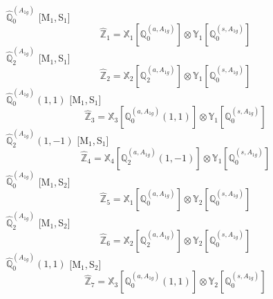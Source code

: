 \documentclass[fleqn,10pt,landscape]{article}
\begin{document}
\begin{itemize}
\vspace{4mm}
\noindent {} $\,\,\,\hat{\mathbb{Q}}_{0}^{(A_{1g})}$ [M$_{1}$,\,S$_{1}$]
\begin{dmath*}
\hat{\mathbb{Z}}_{1}=\mathbb{X}_{1}[\mathbb{Q}_{0}^{(a,A_{1g})}] \otimes\mathbb{Y}_{1}[\mathbb{Q}_{0}^{(s,A_{1g})}]
\end{dmath*}
\vspace{4mm}
\noindent {} $\,\,\,\hat{\mathbb{Q}}_{2}^{(A_{1g})}$ [M$_{1}$,\,S$_{1}$]
\begin{dmath*}
\hat{\mathbb{Z}}_{2}=\mathbb{X}_{2}[\mathbb{Q}_{2}^{(a,A_{1g})}] \otimes\mathbb{Y}_{1}[\mathbb{Q}_{0}^{(s,A_{1g})}]
\end{dmath*}
\vspace{4mm}
\noindent {} $\,\,\,\hat{\mathbb{Q}}_{0}^{(A_{1g})}(1,1)$ [M$_{1}$,\,S$_{1}$]
\begin{dmath*}
\hat{\mathbb{Z}}_{3}=\mathbb{X}_{3}[\mathbb{Q}_{0}^{(a,A_{1g})}(1,1)] \otimes\mathbb{Y}_{1}[\mathbb{Q}_{0}^{(s,A_{1g})}]
\end{dmath*}
\vspace{4mm}
\noindent {} $\,\,\,\hat{\mathbb{Q}}_{2}^{(A_{1g})}(1,-1)$ [M$_{1}$,\,S$_{1}$]
\begin{dmath*}
\hat{\mathbb{Z}}_{4}=\mathbb{X}_{4}[\mathbb{Q}_{2}^{(a,A_{1g})}(1,-1)] \otimes\mathbb{Y}_{1}[\mathbb{Q}_{0}^{(s,A_{1g})}]
\end{dmath*}
\vspace{4mm}
\noindent {} $\,\,\,\hat{\mathbb{Q}}_{0}^{(A_{1g})}$ [M$_{1}$,\,S$_{2}$]
\begin{dmath*}
\hat{\mathbb{Z}}_{5}=\mathbb{X}_{1}[\mathbb{Q}_{0}^{(a,A_{1g})}] \otimes\mathbb{Y}_{2}[\mathbb{Q}_{0}^{(s,A_{1g})}]
\end{dmath*}
\vspace{4mm}
\noindent {} $\,\,\,\hat{\mathbb{Q}}_{2}^{(A_{1g})}$ [M$_{1}$,\,S$_{2}$]
\begin{dmath*}
\hat{\mathbb{Z}}_{6}=\mathbb{X}_{2}[\mathbb{Q}_{2}^{(a,A_{1g})}] \otimes\mathbb{Y}_{2}[\mathbb{Q}_{0}^{(s,A_{1g})}]
\end{dmath*}
\vspace{4mm}
\noindent {} $\,\,\,\hat{\mathbb{Q}}_{0}^{(A_{1g})}(1,1)$ [M$_{1}$,\,S$_{2}$]
\begin{dmath*}
\hat{\mathbb{Z}}_{7}=\mathbb{X}_{3}[\mathbb{Q}_{0}^{(a,A_{1g})}(1,1)] \otimes\mathbb{Y}_{2}[\mathbb{Q}_{0}^{(s,A_{1g})}]
\end{dmath*}
\vspace{4mm}

\end{itemize}
\end{document}

